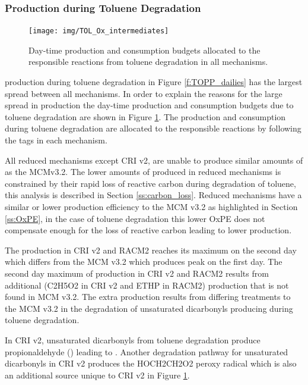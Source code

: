 \subsubsection[Ox Production during Toluene Degradation]{ Production during Toluene Degradation} \label{sss:aromatic}

\begin{figure}
    \centering
    \texttt{[image: img/TOL\_Ox\_intermediates]}
    \vspace{0mm}
    \caption{Day-time  production and consumption budgets allocated to the responsible reactions from toluene degradation in all mechanisms.}
    \vspace{-4mm}
    \label{f:toluene_Ox}
\end{figure}

 production during toluene degradation in Figure \ref{f:TOPP_dailies} has the largest spread between all mechanisms.
In order to explain the reasons for the large spread in  production the day-time  production and consumption budgets due to toluene degradation are shown in Figure \ref{f:toluene_Ox}.
The  production and consumption during toluene degradation are allocated to the responsible reactions by following the tags in each mechanism.

All reduced mechanisms except CRI v2, are unable to produce similar amounts of  as the MCMv3.2.
The lower amounts of  produced in reduced mechanisms is constrained by their rapid loss of reactive carbon during degradation of toluene, this analysis is described in Section \ref{ss:carbon_loss}.
Reduced mechanisms have a similar or lower  production efficiency to the MCM v3.2 as highlighted in Section \ref{ss:OxPE}, in the case of toluene degradation this lower OxPE does not compensate enough for the loss of reactive carbon leading to lower  production.

The  production in CRI v2 and RACM2 reaches its maximum on the second day which differs from the MCM v3.2 which produces peak  on the first day.
The second day maximum of  production in CRI v2 and RACM2 results from additional  (C2H5O2 in CRI v2 and ETHP in RACM2) production that is not found in MCM v3.2.
The extra  production results from differing treatments to the MCM v3.2 in the degradation of unsaturated dicarbonyls producing during toluene degradation.

In CRI v2, unsaturated dicarbonyls from toluene degradation produce propionaldehyde () leading to .
Another degradation pathway for unsaturated dicarbonyls in CRI v2 produces the HOCH2CH2O2 peroxy radical which is also an additional  source unique to CRI v2 in Figure \ref{f:toluene_Ox}.

